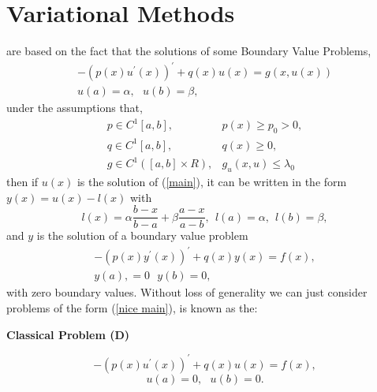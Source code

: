 \chapter{Variational Methods}

 are based on the fact  that the solutions of some Boundary Value Problems,
\begin{equation} 
\label{main}
\begin{array}{lr}
 -(p(x)u^{'}(x))^{'} + q(x)u(x)=g(x,u(x))\\
u(a) = \alpha, \ \ \ u(b)=\beta, 

\end{array}
\end{equation}
under the assumptions that,
\begin{equation} 
\begin{array}{lr}
p\in C^{1}[a,b], & p(x) \geq p_0 >0, \\
q\in C^{1}[a,b], & q(x) \geq 0, \\
g\in C^{1}([a,b]\times R), & g_u(x,u) \leq \lambda_0
\end{array}
\end{equation}
then if $u(x)$ is the solution of (\ref{main}), it can be written in the form $y(x)=u(x)-l(x)$ with
\[l(x)=\alpha \frac{b-x}{b-a} +\beta\frac{a-x}{a-b}, \ \ l(a)=\alpha, \ \ l(b)=\beta,\]
and $y$ is the solution of a boundary value problem
\begin{equation} 
\label{nice main}
\begin{array}{lr}
 -(p(x)y^{'}(x))^{'} + q(x)y(x)=f(x),\\
y(a), = 0\ \ \ y(b)=0,
\end{array}
\end{equation}
with zero  boundary values. Without loss of generality we can just consider
problems of the form (\ref{nice main}), is known as the: \\
\begin{center}
\textbf{Classical Problem (D) }    
\end{center}
\[ -(p(x)u^{'}(x))^{'} + q(x)u(x)=f(x),\]
\[u(a) = 0,\ \ \ u(b)=0.\]

